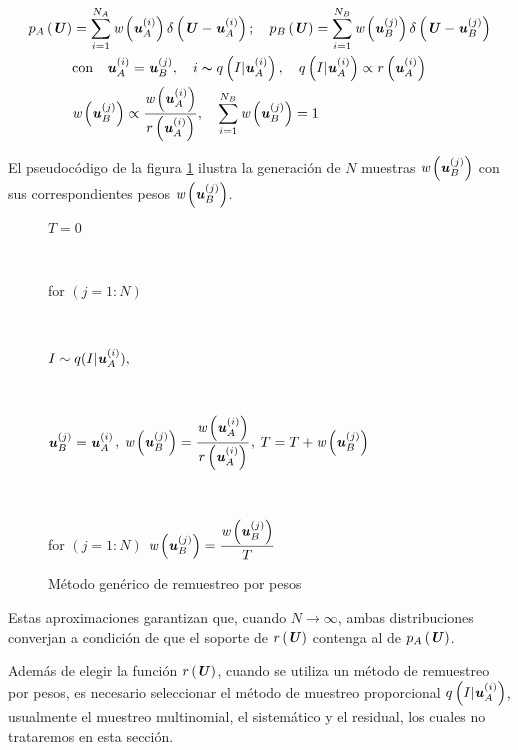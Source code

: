 \begin{equation}
\begin{aligned}
    p_{A}\left(\textbf{\textit{U}}\right) &= \sum_{i=1}^{N_{A}}\textit{w}\left(\textbf{\textit{u}}_{A}^{(i)}\right)\delta\left(\textbf{\textit{U}}-\textbf{\textit{u}}_{A}^{(i)}\right); \quad
    p_{B}\left(\textbf{\textit{U}}\right) = \sum_{i=1}^{N_{B}}\textit{w}\left(\textbf{\textit{u}}_{B}^{(j)}\right)\delta\left(\textbf{\textit{U}}-\textbf{\textit{u}}_{B}^{(j)}\right) \\
    &\text{con} \quad \textbf{\textit{u}}_{A}^{(i)} = \textbf{\textit{u}}_{B}^{(j)}, \quad i \thicksim q\left(I|\textbf{\textit{u}}_{A}^{(i)}\right), \quad q\left(I|\textbf{\textit{u}}_{A}^{(i)}\right) \propto r\left(\textbf{\textit{u}}_{A}^{(i)}\right) \\
    &\textit{w}\left(\textbf{\textit{u}}_{B}^{\left(j\right)}\right) \propto \frac{\textit{w}\left(\textbf{\textit{u}}_{A}^{(i)}\right)}{r\left(\textbf{\textit{u}}_{A}^{(i)}\right)}, \quad \sum_{i=1}^{N_{B}}\textit{w}\left(\textbf{\textit{u}}_{B}^{\left(j\right)}\right) = 1
\end{aligned}
\label{ec:3.5}
\end{equation}

El pseudocódigo de la figura \ref{fig:3.3} ilustra la generación de $N$ muestras $\textit{w}\left(\textbf{\textit{u}}_{B}^{(j)}\right)$ con sus correspondientes pesos $\textit{w}\left(\textbf{\textit{u}}_{B}^{(j)}\right)$.

\begin{figure}[h]
    \centering
    \begin{tcolorbox}[colframe=black, colback=white, boxrule=0.5pt, width=0.72\textwidth, sharp corners]
        \parbox[t]{\linewidth}{$T = 0$} \\
        \parbox[t]{\linewidth}{for $(j=1:N)$} \\
        \parbox[t]{\linewidth}{\hspace{1em} $I \sim q(I|\textbf{\textit{u}}_{A}^{(i)}),$}\\[0.5em]
        \parbox[t]{\linewidth}{\hspace{1em} $\textbf{\textit{u}}_{B}^{(j)} = \textbf{\textit{u}}_{A}^{(i)}$, \quad $\textit{w}\left(\textbf{\textit{u}}_{B}^{(j)}\right) = \dfrac{\textit{w}\left(\textbf{\textit{u}}_{A}^{(i)}\right)}{r\left(\textbf{\textit{u}}_{A}^{(i)}\right)}$, \quad $T = T + \textit{w}\left(\textbf{\textit{u}}_{B}^{(j)}\right)$} \\[0.5em]
        \parbox[t]{\linewidth}{for $(j=1:N)$ \quad $\textit{w}\left(\textbf{\textit{u}}_{B}^{(j)}\right)=\dfrac{\textit{w}\left(\textbf{\textit{u}}_{B}^{(j)}\right)}{T}$}
    \end{tcolorbox}
    \caption{Método genérico de remuestreo por pesos}
    \label{fig:3.3}
\end{figure}

Estas aproximaciones garantizan que, cuando $N \rightarrow \infty$, ambas distribuciones converjan a condición de que el soporte de $r\left(\textbf{\textit{U}}\right)$ contenga al de $p_{A}\left(\textbf{\textit{U}}\right)$.

Además de elegir la función $r\left(\textbf{\textit{U}}\right)$, cuando se utiliza un método de remuestreo por pesos, es necesario seleccionar el método de muestreo proporcional $q\left(I|\textbf{\textit{u}}_{A}^{(i)}\right)$, usualmente el muestreo multinomial, el sistemático y el residual, los cuales no trataremos en esta sección.

